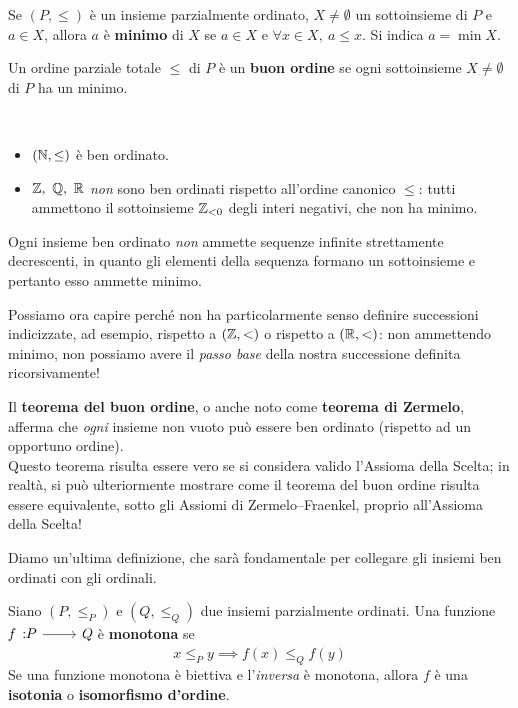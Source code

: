 \begin{define}[Minimo]
	Se $\left(P,\leq\right)$ è un insieme parzialmente ordinato, $X\neq\emptyset$ un sottoinsieme di $P$ e $a\in X$, allora $a$ è \textbf{minimo} di $X$ se $a\in X$ e $\forall x\in X,\ a\leq x$. Si indica $a=\min X$.
\end{define}
\begin{define}
	Un ordine parziale totale $\leq$ di $P$ è un \textbf{buon ordine} se ogni sottoinsieme $X\neq \emptyset$ di $P$ ha un minimo.
\end{define}
\begin{examples}~{}
	\begin{itemize}
		\item $\left(\mathbb{N},\leq\right)$ è ben ordinato.
		\item $\integerset,\ \rationalset,\ \realset$ \textit{non} sono ben ordinati rispetto all'ordine canonico $\leq$: tutti ammettono il sottoinsieme $\mathbb{Z}_{<0}$ degli interi negativi, che non ha minimo.
	\end{itemize}
\end{examples}
\begin{observe}
	Ogni insieme ben ordinato \textit{non} ammette sequenze infinite strettamente decrescenti, in quanto gli elementi della sequenza formano un sottoinsieme e pertanto esso ammette minimo.
\end{observe}
\begin{intuit}
	Possiamo ora capire perché non ha particolarmente senso definire successioni indicizzate, ad esempio, rispetto a $\left(\mathbb{Z},<\right)$ o rispetto a $\left(\mathbb{R},<\right)$: non ammettendo minimo, non possiamo avere il \textit{passo base} della nostra successione definita ricorsivamente!
\end{intuit}
\begin{digression}
	Il \textbf{teorema del buon ordine}, o anche noto come \textbf{teorema di Zermelo}, afferma che \textit{ogni} insieme non vuoto può essere ben ordinato (rispetto ad un opportuno ordine).\\
	Questo teorema risulta essere vero se si considera valido l'Assioma della Scelta; in realtà, si può ulteriormente mostrare come il teorema del buon ordine risulta essere equivalente, sotto gli Assiomi di Zermelo–Fraenkel, proprio all'Assioma della Scelta!
\end{digression}
Diamo un'ultima definizione, che sarà fondamentale per collegare gli insiemi ben ordinati con gli ordinali.
\begin{define}
	Siano $\left(P,\leq_P\right)$ e $\left(Q,\leq_Q\right)$ due insiemi parzialmente ordinati. Una funzione $\funz{f}{P}{Q}$ è \textbf{monotona} se
	\begin{equation}
		x\leq_P y\implies f(x)\leq_Q f(y)
	\end{equation}
Se una funzione monotona è biettiva e l'\textit{inversa} è monotona, allora $f$ è una \textbf{isotonia} o \textbf{isomorfismo d'ordine}.
\end{define}
